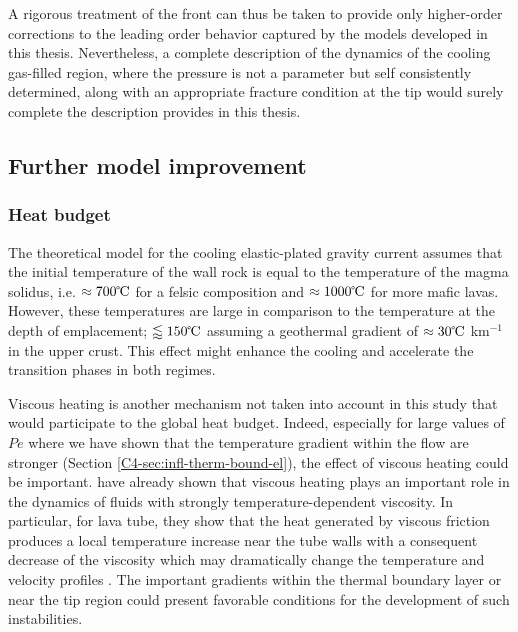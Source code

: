 A rigorous  treatment of the front  can thus be taken  to provide only
higher-order corrections to the leading order behavior captured by the
models developed in this  thesis. Nevertheless, a complete description
of the dynamics  of the cooling gas-filled region,  where the pressure
is not  a parameter  but self consistently  determined, along  with an
appropriate fracture  condition at the  tip would surely  complete the
description provides in this thesis.


\subsection{Further model improvement}
\label{sec:generalization-model}

\subsubsection*{Heat budget}
\label{subsubsection}

The theoretical  model for the cooling  elastic-plated gravity current
assumes that the initial temperature of  the wall rock is equal to the
temperature of  the magma solidus,  i.e. $\approx 700 \celsius$  for a
felsic composition and  $\approx 1000 \celsius$ for  more mafic lavas.
However, these temperatures are large in comparison to the temperature
at the  depth of  emplacement; $\lessapprox  150 \celsius$  assuming a
geothermal gradient  of $\approx 30  \celsius$ km$^{-1}$ in  the upper
crust.   This effect  might  enhance the  cooling  and accelerate  the
transition phases in both regimes.

Viscous heating  is another mechanism  not taken into account  in this
study  that would  participate  to the  global  heat budget.   Indeed,
especially  for large  values of  $Pe$ where  we have  shown that  the
temperature   gradient  within   the   flow   are  stronger   (Section
\ref{C4-sec:infl-therm-bound-el}), the effect of viscous heating could
be important.   \citet{Costa:2005bq} have  already shown  that viscous
heating  plays  an important  role  in  the  dynamics of  fluids  with
strongly  temperature-dependent viscosity.   In  particular, for  lava
tube, they show that the heat generated by viscous friction produces a
local  temperature increase  near  the tube  walls  with a  consequent
decrease  of   the  viscosity   which  may  dramatically   change  the
temperature             and              velocity             profiles
\citep{Costa:2002cj,Costa:2003wk,Costa:2005bq}.      The     important
gradients within  the thermal  boundary layer or  near the  tip region
could  present  favorable  conditions  for  the  development  of  such
instabilities.


